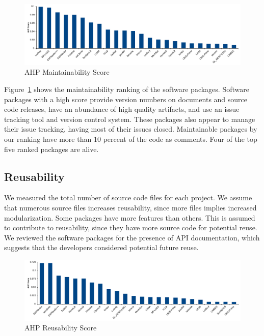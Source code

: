 \documentclass[final, 3p, times, authoryear]{elsarticle}
\begin{document}
\begin{figure}[h!]
	\begin{center}
		\includegraphics[width=1.0\textwidth]{./figures/maintainability_chart.pdf}
		\caption{AHP Maintainability Score}
		\label{Fig_Maintainability}
	\end{center}
\end{figure}

Figure~\ref{Fig_Maintainability} shows the maintainability ranking of the
software packages. Software packages with a high score provide version numbers
on documents and source code releases, have an abundance of high quality
artifacts, and use an issue tracking tool and version control system. These
packages also appear to manage their issue tracking, having most of their issues
closed. Maintainable packages by our ranking have more than 10 percent of the
code as comments. Four of the top five ranked packages are alive.

\subsection{Reusability} \label{reusabilityresults}

We measured the total number of source code files for each project. We assume
that numerous source files increases reusability, since more files implies
increased modularization. Some packages have more features than others.  This is
assumed to contribute to reusability, since they have more source code for
potential reuse. We reviewed the software packages for the presence of API
documentation, which suggests that the developers considered potential future
reuse. 

\begin{figure}[h!]
	\begin{center}
		\includegraphics[width=1.0\textwidth]{./figures/reusability_chart.pdf}
		\caption{AHP Reusability Score}
		\label{Fig_Reusabilty}
	\end{center}
\end{figure}
\end{document}
